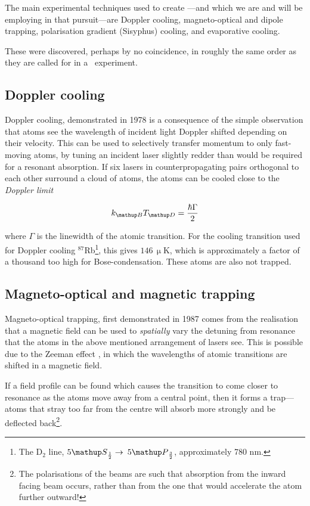 The main experimental techniques used to create \bec---and which we are and will be employing in that pursuit---are Doppler cooling, magneto-optical and dipole trapping, polarisation gradient (Sisyphus) cooling, and evaporative cooling.

These were discovered, perhaps by no coincidence, in roughly the same order as they are called for in a \bec\ experiment.

\subsection{Doppler cooling}

Doppler cooling, demonstrated in 1978 \cite{wineland_radiation-pressure_1978} is a consequence of the simple observation that atoms see the wavelength of incident light Doppler shifted depending on their velocity. This can be used to selectively transfer momentum to only fast-moving atoms, by tuning an incident laser slightly redder than would be required for a resonant absorption. If six lasers in counterpropagating pairs orthogonal to each other surround a cloud of atoms, the atoms can be cooled close to the \emph{Doppler limit} \cite[p 58]{metcalf_laser_1999}

\begin{equation}
k_\up{B} T_\up{D} = \frac{\hbar\Gamma}2
\end{equation}

where $\Gamma$ is the linewidth of the atomic transition. For the cooling transition used for Doppler cooling $^{87}$Rb\footnote{The D$_2$ line, $5\up{S}_{\frac12}\rightarrow$ $5\up{P}_{\frac32}$, approximately 780 nm.}, this gives $146\,\upmu$K, which is approximately a factor of a thousand too high for Bose-condensation. These atoms are also not trapped.

\subsection{Magneto-optical and magnetic trapping}

Magneto-optical trapping, first demonstrated in 1987 \cite{raab_trapping_1987} comes from the realisation that a magnetic field can be used to \emph{spatially} vary the detuning from resonance that the atoms in the above mentioned arrangement of lasers see. This is possible due to the Zeeman effect \cite{zeeman_influence_1897}, in which the wavelengths of atomic transitions are shifted in a magnetic field.

If a field profile can be found which causes the transition to come closer to resonance as the atoms move away from a central point, then it forms a trap---atoms  that stray too far from the centre will absorb more strongly and be deflected back\footnote{The polarisations of the beams are such that absorption from the inward facing beam occurs, rather than from the one that would accelerate the atom further outward!}.

